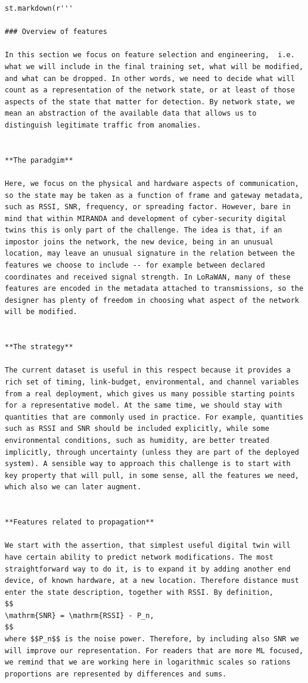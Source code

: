 \documentclass[11pt]{article}
\begin{document}
\begin{verbatim}
st.markdown(r'''

### Overview of features

In this section we focus on feature selection and engineering,  i.e. what we will include in the final training set, what will be modified, and what can be dropped. In other words, we need to decide what will count as a representation of the network state, or at least of those aspects of the state that matter for detection. By network state, we mean an abstraction of the available data that allows us to distinguish legitimate traffic from anomalies.


**The paradgim**

Here, we focus on the physical and hardware aspects of communication, so the state may be taken as a function of frame and gateway metadata, such as RSSI, SNR, frequency, or spreading factor. However, bare in mind that within MIRANDA and development of cyber-security digital twins this is only part of the challenge. The idea is that, if an impostor joins the network, the new device, being in an unusual location, may leave an unusual signature in the relation between the features we choose to include -- for example between declared coordinates and received signal strength. In LoRaWAN, many of these features are encoded in the metadata attached to transmissions, so the designer has plenty of freedom in choosing what aspect of the network will be modified.


**The strategy**

The current dataset is useful in this respect because it provides a rich set of timing, link-budget, environmental, and channel variables from a real deployment, which gives us many possible starting points for a representative model. At the same time, we should stay with quantities that are commonly used in practice. For example, quantities such as RSSI and SNR should be included explicitly, while some environmental conditions, such as humidity, are better treated implicitly, through uncertainty (unless they are part of the deployed system). A sensible way to approach this challenge is to start with key property that will pull, in some sense, all the features we need, which also we can later augment.


**Features related to propagation**

We start with the assertion, that simplest useful digital twin will have certain ability to predict network modifications. The most straightforward way to do it, is to expand it by adding another end device, of known hardware, at a new location. Therefore distance must enter the state description, together with RSSI. By definition,
$$
\mathrm{SNR} = \mathrm{RSSI} - P_n,
$$
where $$P_n$$ is the noise power. Therefore, by including also SNR we will improve our representation. For readers that are more ML focused, we remind that we are working here in logarithmic scales so rations proportions are represented by differences and sums.


\end{verbatim}
\end{document}
